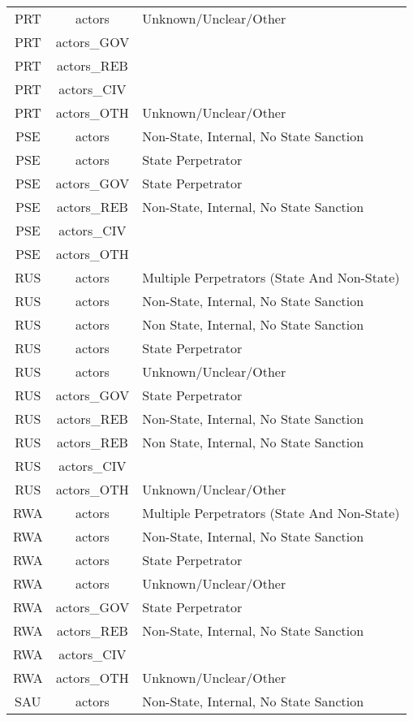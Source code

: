 \documentclass[12pt]{article}
\begin{document}
\begin{center}
\begin{longtable}{|c|c|p{10cm}|}
  PRT & actors & Unknown/Unclear/Other \\ 
  PRT & actors\_GOV &  \\ 
  PRT & actors\_REB &  \\ 
  PRT & actors\_CIV &  \\ 
  PRT & actors\_OTH & Unknown/Unclear/Other \\ 
  PSE & actors & Non-State, Internal, No State Sanction \\ 
  PSE & actors & State Perpetrator \\ 
  PSE & actors\_GOV & State Perpetrator \\ 
  PSE & actors\_REB & Non-State, Internal, No State Sanction \\ 
  PSE & actors\_CIV &  \\ 
  PSE & actors\_OTH &  \\ 
  RUS & actors & Multiple Perpetrators (State And Non-State) \\ 
  RUS & actors & Non-State, Internal, No State Sanction \\ 
  RUS & actors & Non State, Internal, No State Sanction \\ 
  RUS & actors & State Perpetrator \\ 
  RUS & actors & Unknown/Unclear/Other \\ 
  RUS & actors\_GOV & State Perpetrator \\ 
  RUS & actors\_REB & Non-State, Internal, No State Sanction \\ 
  RUS & actors\_REB & Non State, Internal, No State Sanction \\ 
  RUS & actors\_CIV &  \\ 
  RUS & actors\_OTH & Unknown/Unclear/Other \\ 
  RWA & actors & Multiple Perpetrators (State And Non-State) \\ 
  RWA & actors & Non-State, Internal, No State Sanction \\ 
  RWA & actors & State Perpetrator \\ 
  RWA & actors & Unknown/Unclear/Other \\ 
  RWA & actors\_GOV & State Perpetrator \\ 
  RWA & actors\_REB & Non-State, Internal, No State Sanction \\ 
  RWA & actors\_CIV &  \\ 
  RWA & actors\_OTH & Unknown/Unclear/Other \\ 
  SAU & actors & Non-State, Internal, No State Sanction \\ 

\end{longtable}
\end{center}
\end{document}
